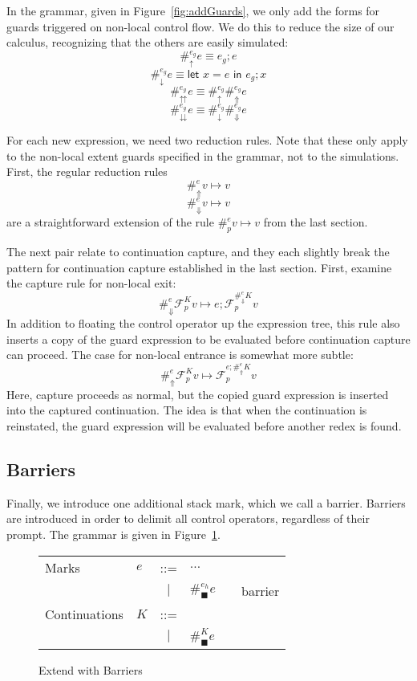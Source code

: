 \documentclass[11pt]{article}
\newcommand{\maybePage}{\newpage}
\newcommand{\letin}[2]{\textsf{let }#1\textsf{ in }#2}
\newcommand\F{\mathcal{F}}
\begin{document}
In the grammar, given in Figure~\ref{fig:addGuards}, we only add the forms for guards triggered on non-local control flow.
We do this to reduce the size of our calculus, recognizing that the others are easily simulated:
$$\#_\uparrow^{e_g}e \equiv e_g; e$$
$$\#_\downarrow^{e_g}e \equiv \letin{x=e}{e_g; x}$$
$$\#_\upuparrows^{e_g}e \equiv \#_\uparrow^{e_g}\#_\Uparrow^{e_g}e$$
$$\#_\downdownarrows^{e_g}e \equiv \#_\downarrow^{e_g}\#_\Downarrow^{e_g}e$$


For each new expression, we need two reduction rules.
Note that these only apply to the non-local extent guards specified in the grammar, not to the simulations.
First, the regular reduction rules
$$\#_{\Uparrow}^{e}v \mapsto v$$
$$\#_{\Downarrow}^{e}v \mapsto v$$
are a straightforward extension of the rule $\#_{p}^{e}v \mapsto v$ from the last section.

The next pair relate to continuation capture, and they each slightly break the pattern for continuation capture established in the last section.
First, examine the capture rule for non-local exit:
$$\#_{\Downarrow}^{e}\F_p^K v \mapsto e;\F_p^{\#_\Downarrow^{e}K}v$$
In addition to floating the control operator up the expression tree, this rule also inserts a copy of the guard expression to be evaluated before continuation capture can proceed.
The case for non-local entrance is somewhat more subtle:
$$\#_{\Uparrow}^{e}\F_p^K v \mapsto \F_p^{e;\#_\Uparrow^{e}K}v$$
Here, capture proceeds as normal, but the copied guard expression is inserted into the captured continuation.
The idea is that when the continuation is reinstated, the guard expression will be evaluated before another redex is found.

\maybePage
\subsection{Barriers}

Finally, we introduce one additional stack mark, which we call a barrier.
Barriers are introduced in order to delimit all control operators, regardless of their prompt.
The grammar is given in Figure~\ref{fig:addBarriers}.

\begin{figure}[H]
\caption{Extend with Barriers}
\label{fig:addBarriers}

\begin{tabular}{llclll}
Marks & $e$ & ::= & $\ldots$ &  \\
& & $|$ & $\#_\blacksquare^{e_h}e$ && barrier \\
Continuations & $K$ & ::= & \\
& & $|$ & $\#_{\blacksquare}^{K}e$ &&  \\
\end{tabular}
\end{figure}
\end{document}
